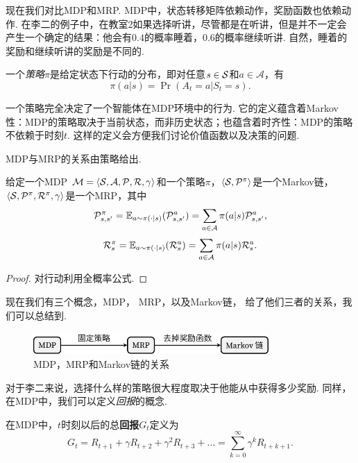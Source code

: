 现在我们对比MDP和MRP. MDP中，状态转移矩阵依赖动作，奖励函数也依赖动作. 在李二的例子中，在教室2如果选择听讲，尽管都是在听讲，但是并不一定会产生一个确定的结果：他会有$0.4$的概率睡着，$0.6$的概率继续听讲. 自然，睡着的奖励和继续听讲的奖励是不同的.

\begin{definition}[策略]
一个\textit{策略}$\pi$是给定状态下行动的分布，即对任意$s\in\mathcal S$和$a\in\mathcal A$，有
    \[\pi(a|s) = \Pr(A_t=a | S_t = s).\]
\end{definition}
一个策略完全决定了一个智能体在MDP环境中的行为. 它的定义蕴含着Markov性：MDP的策略取决于当前状态，而非历史状态；也蕴含着时齐性：MDP的策略不依赖于时刻$t$. 这样的定义会方便我们讨论价值函数以及决策的问题.

MDP与MRP的关系由策略给出. 
\begin{proposition}
给定一个MDP $\mathcal M=\langle\mathcal S,\mathcal A,\mathcal P,\mathcal R, \gamma\rangle$和一个策略$\pi$，$\langle \mathcal S, \mathcal P^{\pi}\rangle$是一个Markov链，$\langle\mathcal S,\mathcal P^{\pi}, \mathcal R^{\pi}, \gamma\rangle$是一个MRP，其中
\[\mathcal P_{s,s'}^{\pi} = \mathbb{E}_{a\sim\pi(\cdot|s)}(\mathcal P^a_{s,s'})=\sum_{a\in \mathcal A}\pi(a|s)\mathcal P_{s,s'}^{a},\]
    \[\mathcal R_s^{\pi} =\mathbb{E}_{a\sim\pi(\cdot|s)}(\mathcal R^a_s)=\sum_{a\in\mathcal A}\pi(a|s)\mathcal R_s^a.\]
\end{proposition}
\begin{proof}
对行动利用全概率公式. 
\end{proof}

现在我们有三个概念，MDP， MRP，以及Markov链， 给了他们三者的关系，我们可以总结到. 

\begin{figure}[ht]
\centering
\includegraphics[width=0.8\textwidth]{figures/Markov-chain/MDP-MRP-Markov-chain.pdf}
\caption{MDP，MRP和Markov链的关系}\label{fig:MDP-MRP-MarkovChain}
\end{figure}

对于李二来说，选择什么样的策略很大程度取决于他能从中获得多少奖励. 同样，在MDP中，我们可以定义\textit{回报}的概念. 

\begin{definition}[回报]
在MDP中，$t$时刻以后的总\textbf{回报}$G_t$定义为
    \[G_t = R_{t+1} + \gamma R_{t+2} + \gamma^2 R_{t+3} + \dots = \sum_{k=0}^\infty \gamma^k R_{t+k+1}.\]
\end{definition}

